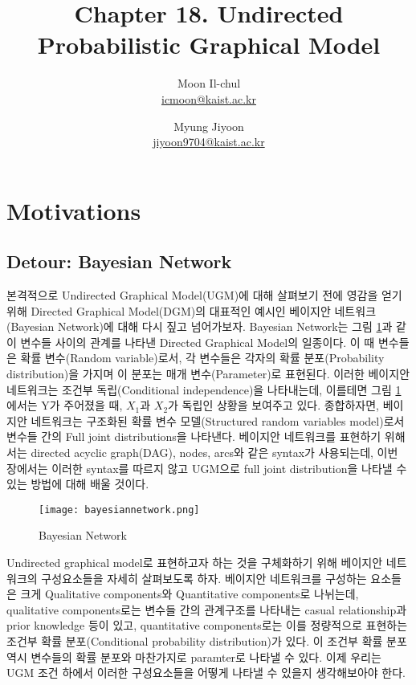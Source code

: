 \documentclass[draft=false]{oblivoir}
\author{Moon Il-chul \\ \href{mailto:icmoon@kaist.ac.kr}{icmoon@kaist.ac.kr} 
   \and Myung Jiyoon \\ \href{mailto:jiyoon9704@kaist.ac.kr}{jiyoon9704@kaist.ac.kr} }
\title{Chapter 18. Undirected Probabilistic Graphical Model}
\begin{document}
\maketitle
\tableofcontents

\section{Motivations}

\subsection{Detour: Bayesian Network}
본격적으로 Undirected Graphical Model(UGM)에 대해 살펴보기 전에 영감을 얻기 위해 Directed Graphical Model(DGM)의 대표적인 예시인 베이지안 네트워크(Bayesian Network)에 대해 다시 짚고 넘어가보자. 
Bayesian Network는 그림 \ref{fig:18-1}과 같이 변수들 사이의 관계를 나타낸 Directed Graphical Model의 일종이다. 이 때 변수들은 확률 변수(Random variable)로서, 각 변수들은 각자의 확률 분포(Probability distribution)을 가지며 이 분포는 매개 변수(Parameter)로 표현된다. 이러한 베이지안 네트워크는 조건부 독립(Conditional independence)을 나타내는데, 이를테면 그림 \ref{fig:18-1}에서는 Y가 주어졌을 때, $X_1$과 $X_2$가 독립인 상황을 보여주고 있다. 종합하자면, 베이지안 네트워크는 구조화된 확률 변수 모델(Structured random variables model)로서 변수들 간의 Full joint distributions을 나타낸다. 베이지안 네트워크를 표현하기 위해서는 directed acyclic graph(DAG), nodes, arcs와 같은 syntax가 사용되는데, 이번 장에서는 이러한 syntax를 따르지 않고 UGM으로 full joint distribution을 나타낼 수 있는 방법에 대해 배울 것이다.

\begin{figure}[ht] \centering 
  \texttt{[image: bayesiannetwork.png]}
  \caption{Bayesian Network}
  \label{fig:18-1}
\end{figure}

Undirected graphical model로 표현하고자 하는 것을 구체화하기 위해 베이지안 네트워크의 구성요소들을 자세히 살펴보도록 하자. 베이지안 네트워크를 구성하는 요소들은 크게 Qualitative components와 Quantitative components로 나뉘는데, qualitative components로는 변수들 간의 관계구조를 나타내는 casual relationship과 prior knowledge 등이 있고, quantitative components로는 이를 정량적으로 표현하는 조건부 확률 분포(Conditional probability distribution)가 있다. 이 조건부 확률 분포 역시 변수들의 확률 분포와 마찬가지로 paramter로 나타낼 수 있다. 이제 우리는 UGM 조건 하에서 이러한 구성요소들을 어떻게 나타낼 수 있을지 생각해보아야 한다.
\end{document}

